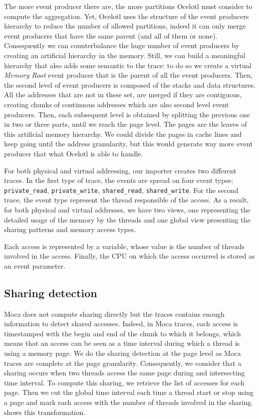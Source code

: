 The more event producer there are, the more partitions \gls{Ocelotl} must consider to compute the aggregation.
Yet, \gls{Ocelotl} uses the structure of the event producers hierarchy to reduce the number of allowed partitions, indeed it can only merge event producers that have the same parent (and all of them or none).
Consequently we can counterbalance the huge number of event producers by creating an artificial hierarchy in the memory.
Still, we can build a meaningful hierarchy that also adds some semantic to the trace: to do so we create a virtual \emph{Memory Root} event producer that is the parent of all the event producers.
Then, the second level of event producers is composed of the stacks and data structures.
All the addresses that are not in these set, are merged if they are contiguous, creating chunks of continuous addresses which are also second level event producers.
Then, each subsequent level is obtained by splitting the previous one in two or three parts, until we reach the page level.
The pages are the leaves of this artificial memory hierarchy.
We could divide the pages in cache lines and keep going until the address granularity, but this would generate way more event producer that what \gls{Ocelotl} is able to handle.

For both physical and virtual addressing, our importer creates two different traces.
In the first type of trace, the events are spread on four event types: \texttt{private\_read}, \texttt{private\_write}, \texttt{shared\_read}, \texttt{shared\_write}.
For the second trace, the event type represent the  thread responsible of the access.
As a result, for both physical and virtual addresses, we have two views, one representing the detailed usage of the memory by the threads and one global view presenting the sharing patterns and memory access types.

Each access is represented by a variable, whose value is the number of threads involved in the access.
Finally, the \gls{CPU} on which the access occurred is stored as an event parameter.

\subsection{Sharing detection}

\gls{Moca} does not compute sharing directly but the traces contains enough information to detect shared accesses.
Indeed, in \gls{Moca} traces, each access is timestamped with the begin and end of the chunk to which it belongs, which means that an access can be seen as a time interval during which a thread is using a memory page.
We do the sharing detection at the page level as \gls{Moca} traces are complete at the page granularity.
Consequently, we consider that a sharing occurs when two threads access the same page during and intersecting time interval.
To compute this sharing, we retrieve the list of accesses for each page.
Then we cut the global time interval each time a thread start or stop using a page and mark each access with the number of threads involved in the sharing.
 shows this transformation.

